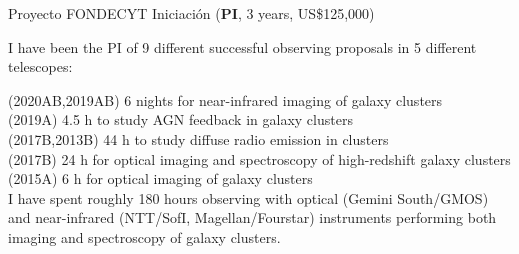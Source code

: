 \documentclass[11pt]{article}
\begin{document}


\hline

\pagebreak


\noindent
{} Proyecto FONDECYT Iniciaci\'on (\textbf{PI}, 3 years, US\$125,000)



\noindent
I have been the PI of 9 different successful observing proposals in 5 different telescopes:

\noindent
{} (2020AB,2019AB) 6 nights for near-infrared imaging of galaxy clusters\\
 (2019A) 4.5 h to study AGN feedback in galaxy clusters\\
 (2017B,2013B) 44 h to study diffuse radio emission in clusters\\
 (2017B) 24 h for optical imaging and spectroscopy of high-redshift galaxy clusters\\
 (2015A) 6 h for optical imaging of galaxy clusters\\


{I have spent roughly 180 hours observing with 
optical (Gemini South/GMOS) and near-infrared (NTT/SofI, Magellan/Fourstar) instruments performing both 
imaging and spectroscopy of galaxy clusters.}


%
\end{document}
